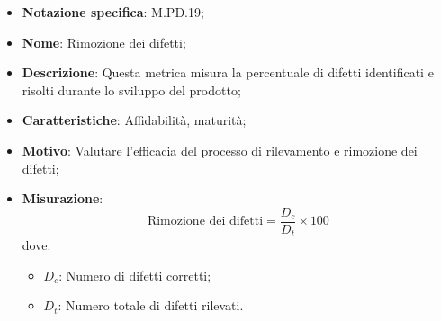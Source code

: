 \begin{itemize}
    \item \textbf{Notazione specifica}: M.PD.19;
    \item \textbf{Nome}: Rimozione dei difetti;
    \item \textbf{Descrizione}: Questa metrica misura la percentuale di difetti identificati e risolti durante lo sviluppo del prodotto;
    \item \textbf{Caratteristiche}: Affidabilità, maturità;
    \item \textbf{Motivo}: Valutare l'efficacia del processo di rilevamento e rimozione dei difetti;
    \item \textbf{Misurazione}:
    \[
        \text{Rimozione dei difetti} = \frac{D_{c}}{D_{t}} \times 100
    \]
    dove:
    \begin{itemize}
        \item $D_{c}$: Numero di difetti corretti;
        \item $D_{t}$: Numero totale di difetti rilevati.
    \end{itemize}
\end{itemize}